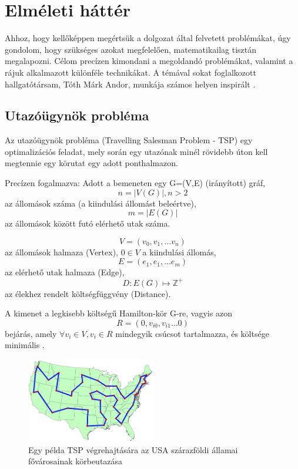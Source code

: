 \chapter{Elméleti háttér} \label{theoryChapter}

Ahhoz, hogy kellőképpen megértsük a dolgozat által felvetett problémákat, úgy gondolom, hogy szükséges azokat megfelelően, matematikailag tisztán megalapozni. Célom precízen kimondani a megoldandó problémákat, valamint a rájuk alkalmazott különféle technikákat. A témával sokat foglalkozott hallgatótársam, Tóth Márk Andor, munkája számos helyen inspirált \cite{alg_optim}.

\section{Utazóügynök probléma } \label{TSPsection}

Az utazóügynök probléma (Travelling Salesman Problem - TSP)  egy optimalizációs feladat, mely során egy utazónak minél rövidebb úton kell megtennie egy körutat egy adott ponthalmazon. 

Precízen fogalmazva: Adott a bemeneten egy G=(V,E) (irányított) gráf, \[n = |V(G)|, n > 2 \] az állomások száma (a kiindulási állomást beleértve),  \[m = |E(G)| \] az állomások között futó elérhető utak száma.

\[ V = (v_0,v_1, \dots v_n )\] az állomások halmaza (Vertex), \(0 \in V\) a kiindulási állomás,
\[ E = (e_1,e_1, \dots e_m)\] az elérhető utak halmaza (Edge),
\[ D : E(G) \mapsto \mathbb{Z}^+\] az élekhez rendelt költségfüggvény (Distance).

A kimenet a legkisebb költségű Hamilton-kör G-re, vagyis azon 
\[ R = (0, v_{i0}, v_{i1} ... 0) \]
bejárás, amely \( \forall v_i \in V, v_i \in R \) mindegyik csúcsot tartalmazza, és költsége minimális \cite{alg_optim}.

\begin{figure}[ht!]
	\centering
	\includegraphics[width=0.5\textwidth]{figures/tsp-usacities.png}
	\caption{Egy példa TSP végrehajtására az USA szárazföldi államai fővárosainak körbeutazása \label{TSPpelda} \cite{TSPimage} }
\end{figure}

